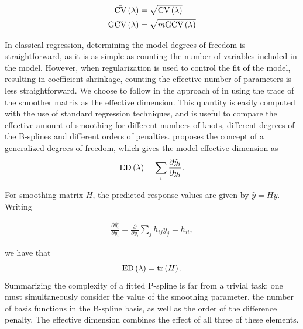 \documentclass[12pt]{article}
\theoremstyle{definition}
\begin{document}
\begin{equation}
\begin{split}
\bar{\textup{CV}}\left(\lambda\right) &= \sqrt{\textup{CV}\left(\lambda\right)} \\
\bar{\textup{GCV}}\left(\lambda\right) &= \sqrt{m\textup{GCV}\left(\lambda\right)} \\
\end{split}
\end{equation}


In classical regression, determining the model degrees of freedom is straightforward, as it is as simple as counting the number of variables included in the model. However, when regularization is used to control the fit of the model, resulting in coefficient shrinkage, counting the effective number of parameters is less straightforward. We choose to follow in the approach of \cite{hastie1986generalized} in using the trace of the smoother matrix as the effective dimension. This quantity is easily computed with the use of standard regression techniques, and is useful to compare the effective amount of smoothing for different numbers of knots, different degrees of the B-splines and different orders of penalties. \cite{ye1998measuring} proposes the concept of a generalized degrees of freedom, which gives the model effective dimension as 
\[
\textup{ED}\left(\lambda\right) = \sum_i \frac{\partial \hat{y}_i}{\partial y_i}.
\]

For smoothing matrix $H$, the predicted response values are given by $\hat{y} = H y$. Writing

\begin{align*}
\frac{\partial \hat{y_i}}{\partial y_i} = \frac{\partial }{\partial y_i} \sum_{j} h_{ij} y_j = h_{ii},
\end{align*}

we have that 
\begin{equation}
\textup{ED}\left(\lambda\right) = \textup{tr}\left(H\right).
\end{equation}
Summarizing the complexity of a fitted P-spline is far from a trivial task; one must simultaneously consider the value of the smoothing parameter, the number of basis functions in the B-spline basis, as well as the order of the difference penalty. The effective dimension combines the effect of all three of these elements.
\end{document}
